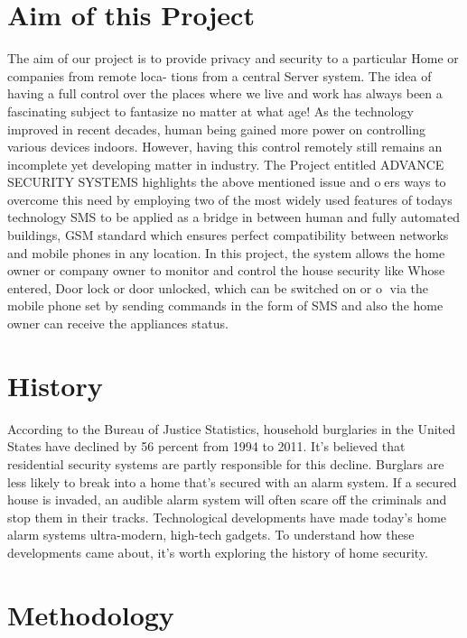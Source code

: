 \documentclass[twoside,a4paper,16pt]{book}
\begin{document}
{\section{Aim of this Project}
The aim of our project is to provide privacy and security to a particular Home or companies from remote loca-
tions from a central Server system. The idea of having a full control over the places where we live and work has always
been a fascinating subject to fantasize no matter at what age! As the technology improved in recent decades, human
being gained more power on controlling various devices indoors. However, having this control remotely still remains
an incomplete yet developing matter in industry.
The Project entitled ADVANCE SECURITY SYSTEMS highlights the above mentioned issue and oers ways to
overcome this need by employing two of the most widely used features of todays technology SMS to be applied as a
bridge in between human and fully automated buildings, GSM standard which ensures perfect compatibility between
networks and mobile phones in any location.
In this project, the system allows the home owner or company owner to monitor and control the house security like
Whose entered, Door lock or door unlocked, which can be switched on or o via the mobile phone set by sending
commands in the form of SMS and also the home owner can receive the appliances status.
\section{History}
According to the Bureau of Justice Statistics, household burglaries in the United States have declined by 56 percent from 1994 to 2011. It's believed that residential security systems are partly responsible for this decline. Burglars are less likely to break into a home that's secured with an alarm system. If a secured house is invaded, an audible alarm system will often scare off the criminals and stop them in their tracks. Technological developments have made today's home alarm systems ultra-modern, high-tech gadgets. To understand how these developments came about, it's worth exploring the history of home security.\\

\section{ Methodology}

}
\end{document}

